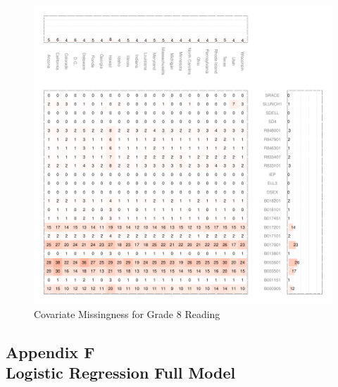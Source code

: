 \documentclass[letterpaper,12p,twoside]{article} %
\begin{document}
\begin{figure}[h]
\begin{center}
\includegraphics[width=\textwidth]{../Figures2009/g8read-missing.pdf}
\caption{Covariate Missingness for Grade 8 Reading}
\label{fig:g8reading:missing}
\end{center}
\end{figure}


\clearpage
{}
\subsection*{Appendix F\\Logistic Regression Full Model}
\label{appendixlogistic}
\end{document}
